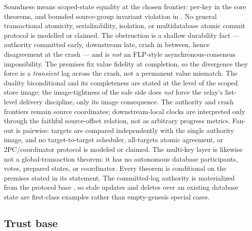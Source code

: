 \documentclass[11pt,a4paper]{article}
\begin{document}
Soundness means scoped-state equality at the chosen frontier: per-key in the
core theorems, and bounded source-group invariant violation in
. No general
transactional atomicity, serializability, isolation, or multidatabase atomic
commit protocol is modelled or claimed.
The obstruction is a shallow durability fact --- authority committed early,
downstream late, crash in between, hence disagreement at the crash --- and is
\emph{not} an FLP-style asynchronous-consensus impossibility. The
 premises fix value fidelity at
completion, so the divergence they force is a \emph{transient} lag across the
crash, not a permanent value mismatch. The duality biconditional and its
completeness are stated at the level of the scoped store image; the image-tightness
of the safe side does \emph{not} force the relay's list-level delivery
discipline, only its image consequence. The authority and crash frontiers remain
source coordinates; downstream-local clocks are interpreted only through the
faithful source-offset relation, not as arbitrary progress metrics. Fan-out is
pairwise: targets are compared independently with the single authority image, and
no target-to-target scheduler, all-targets atomic agreement, or 2PC/coordinator
protocol is modeled or claimed. The multi-key layer is likewise not a
global-transaction theorem: it has no autonomous database participants, votes,
prepared states, or coordinator. Every theorem is
conditional on the premises stated in its statement. The committed-log authority
 is materialized from the protocol base
, so stale updates and deletes over an existing database state are
first-class examples rather than empty-genesis special cases.

\subsection*{Trust base}
\end{document}
